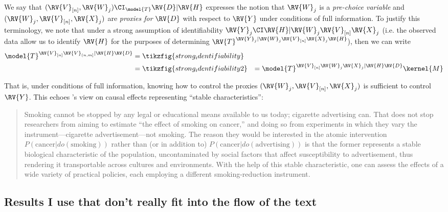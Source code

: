 We say that $(\RV{V}_{[n]},\RV{W}_j)\CI_{\model{T}} \RV{D}|\RV{H}$ expresses the notion that $\RV{W}_j$ is a \emph{pre-choice variable} and $(\RV{W}_j,\RV{V}_{[n]},\RV{X}_j)$ are \emph{proxies for }$\RV{D}$ with respect to $\RV{Y}$ under conditions of full information. To justify this terminology, we note that under a strong assumption of identifiability $\RV{Y}_j\CI\RV{H}|\RV{W}_j\RV{V}_{[n]}\RV{X}_j$ (i.e. the observed data allow us to identify $\RV{H}$ for the purposes of determining $\RV{T}^{\RV{Y}_j|\RV{W}_j\RV{V}_{[n]}\RV{X}_j\RV{H}}$), then we can write
\begin{align}
    \model{T}^{\RV{V}_{[n]}\RV{V}_{(n,m]}|\RV{H}\RV{D}} &=\tikzfig{strong_identifiability}\\
                                              &=\tikzfig{strong_identifiability2}
                                              &= \model{T}^{\RV{V}_{[n]}\RV{W}_j\RV{X}_j|\RV{H}\RV{D}}\kernel{M}
\end{align}

That is, under conditions of full information, knowing how to control the proxies $(\RV{W}_j,\RV{V}_{[n]},\RV{X}_j)$ is sufficient to control $\RV{Y}$. This echoes \citet{pearl_does_2018}'s view on causal effects representing ``stable characteristics'':
\begin{quote}
Smoking cannot be stopped by any legal or educational means available to us today; cigarette advertising can. That does not stop researchers from aiming to estimate ``the effect of smoking on cancer,'' and doing so from experiments in which they vary the instrument—cigarette advertisement—not smoking. The reason they would be interested in the atomic intervention $P(\text{cancer}|do(\text{smoking}))$ rather than (or in addition to) $P(\text{cancer}|do(\text{advertising}))$ is that the former represents a stable biological characteristic of the population, uncontaminated by social factors that affect susceptibility to advertisement, thus rendering it transportable across cultures and environments. With the help of this stable characteristic, one can assess the effects of a wide variety of practical policies, each employing a different smoking-reduction instrument.
\end{quote}



\subsection{Results I use that don't really fit into the flow of the text}

